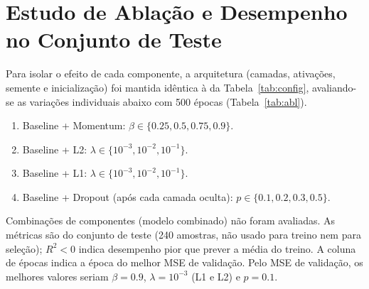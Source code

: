 \documentclass[11pt,a4paper]{article}
\begin{document}
\section{Estudo de Ablação e Desempenho no Conjunto de Teste}
Para isolar o efeito de cada componente, a arquitetura (camadas, ativações, semente e inicialização) foi mantida idêntica à da Tabela~\ref{tab:config}, avaliando-se as variações individuais abaixo com 500 épocas (Tabela~\ref{tab:abl}).
\begin{enumerate}
\item Baseline + Momentum: $\beta\in\{0.25,0.5,0.75,0.9\}$.
\item Baseline + L2: $\lambda\in\{10^{-3},10^{-2},10^{-1}\}$.
\item Baseline + L1: $\lambda\in\{10^{-3},10^{-2},10^{-1}\}$.
\item Baseline + Dropout (após cada camada oculta): $p\in\{0.1,0.2,0.3,0.5\}$.
\end{enumerate}
Combinações de componentes (modelo combinado) não foram avaliadas. As métricas são do conjunto de teste (240 amostras, não usado para treino nem para seleção); $R^2<0$ indica desempenho pior que prever a média do treino. A coluna de épocas indica a época do melhor MSE de validação. Pelo MSE de validação, os melhores valores seriam $\beta=0.9$, $\lambda=10^{-3}$ (L1 e L2) e $p=0.1$.
\end{document}

